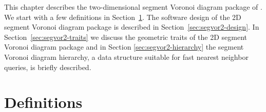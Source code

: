 
\newcommand{\hide}[1]{}


This chapter describes the two-dimensional segment Voronoi diagram
package of \cgal. We start with a few definitions in 
Section~\ref{sec:segvor2-definitions}.
The software design of the 2D segment Voronoi diagram package is
described in Section~\ref{sec:segvor2-design}.
In Section~\ref{sec:segvor2-traits} we discuss the geometric
traits of the 2D segment Voronoi diagram package and in Section
\ref{sec:segvor2-hierarchy} the segment Voronoi diagram hierarchy, a
data structure suitable for fast nearest neighbor queries, is briefly
described.


\section{Definitions}
\label{sec:segvor2-definitions}

